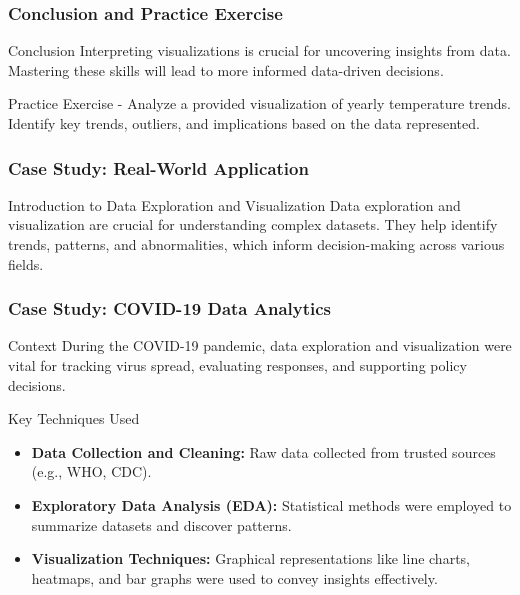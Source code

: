 \documentclass[aspectratio=169]{beamer}
\begin{document}
\begin{frame}[fragile]
    \frametitle{Conclusion and Practice Exercise}
    \begin{block}{Conclusion}
        Interpreting visualizations is crucial for uncovering insights from data. Mastering these skills will lead to more informed data-driven decisions.
    \end{block}

    \begin{block}{Practice Exercise}
        - Analyze a provided visualization of yearly temperature trends. Identify key trends, outliers, and implications based on the data represented.
    \end{block}
\end{frame}

\begin{frame}
  \frametitle{Case Study: Real-World Application}
  \begin{block}{Introduction to Data Exploration and Visualization}
    Data exploration and visualization are crucial for understanding complex datasets. They help identify trends, patterns, and abnormalities, which inform decision-making across various fields.
  \end{block}
\end{frame}

\begin{frame}
  \frametitle{Case Study: COVID-19 Data Analytics}
  \begin{block}{Context}
    During the COVID-19 pandemic, data exploration and visualization were vital for tracking virus spread, evaluating responses, and supporting policy decisions.
  \end{block}

  \begin{block}{Key Techniques Used}
    \begin{itemize}
      \item \textbf{Data Collection and Cleaning:} Raw data collected from trusted sources (e.g., WHO, CDC).
      \item \textbf{Exploratory Data Analysis (EDA):} Statistical methods were employed to summarize datasets and discover patterns.
      \item \textbf{Visualization Techniques:} Graphical representations like line charts, heatmaps, and bar graphs were used to convey insights effectively.
    \end{itemize}
  \end{block}
\end{frame}
\end{document}

